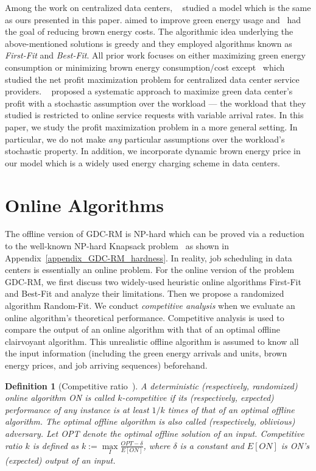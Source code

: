 \documentclass[conference]{IEEEtran}
\newtheorem{definition}{Definition} \newtheorem{theorem}{Theorem} \newtheorem{remark}{Remark} \newtheorem{corollary}{Corollary}
\begin{document}
Among the work on centralized data centers, ~\cite{GoiriL11, Krioukov11} studied a model which is the same as ours presented in this paper. \cite{AksanliV11} aimed to improve green energy usage and~\cite{LiuC12} had the goal of reducing brown energy costs. The algorithmic idea underlying the above-mentioned solutions is greedy and they employed algorithms known as \emph{First-Fit} and \emph{Best-Fit}. All prior work focuses on either maximizing green energy consumption or minimizing brown energy consumption/cost except~\cite{GhamkhariR13} which studied the net profit maximization problem for centralized data center service providers. ~\cite{GhamkhariR13} proposed a systematic approach to maximize green data center's profit with a stochastic assumption over the workload --- the workload that they studied is restricted to online service requests with variable arrival rates. In this paper, we study the profit maximization problem in a more general setting. In particular, we do not make \emph{any} particular assumptions over the workload's stochastic property. In addition, we incorporate dynamic brown energy price in our model which is a widely used energy charging scheme in data centers.



\section{Online Algorithms}

The offline version of GDC-RM is NP-hard which can be proved via a reduction to the well-known NP-hard Knapsack problem~\cite{GareyJ79} as shown in Appendix~\ref{appendix_GDC-RM_hardness}. In reality, job scheduling in data centers is essentially an online problem. For the online version of the problem GDC-RM, we first discuss two widely-used heuristic online algorithms First-Fit and Best-Fit and analyze their limitations. Then we propose a randomized algorithm Random-Fit.  We conduct \emph{competitive analysis} when we evaluate an online algorithm's theoretical performance. Competitive analysis is used to compare the output of an online algorithm with that of an optimal offline clairvoyant algorithm. This unrealistic offline algorithm is assumed to know all the input information (including the green energy arrivals and units, brown energy prices, and job arriving sequences) beforehand.

\begin{definition}[Competitive ratio~\cite{BorodinE98}]
A deterministic (respectively, randomized) online algorithm ON is called $k$-competitive if its (respectively, expected) performance of any instance is at least $1 / k$ times of that of an optimal offline algorithm. The optimal offline algorithm is also called (respectively, oblivious) adversary. Let OPT denote the optimal offline solution of an input. Competitive ratio $k$ is defined as $k := \max \limits_{I} \frac{OPT - \delta}{E[ON]}$, where $\delta$ is a constant and $E[ON]$ is ON's (expected) output of an input.
\end{definition}
\end{document}
